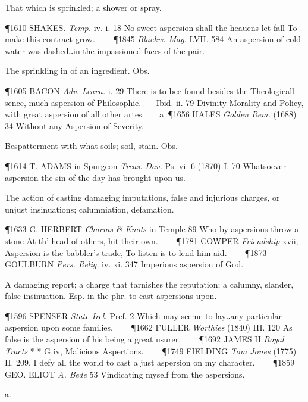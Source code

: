 \begin{description}[wide, labelwidth=!, labelindent=0pt]
\begin{myenumerate}
 That which is sprinkled; a shower or spray.

\P 1610 SHAKES.  \textit{Temp.} iv. i. 18 No sweet aspersion shall the heauens let fall To make this contract grow.    
\P 1845 \textit{Blackw. Mag.} LVII. 584 An aspersion of cold water was dashed‥in the impassioned faces of the pair.

 The sprinkling in of an ingredient. Obs.

\P 1605 BACON  \textit{Adv. Learn.} i. 29 There is to bee found besides the Theologicall sence, much aspersion of Philosophie.    Ibid. ii. 79 Divinity Morality and Policy, with great aspersion of all other artes.    a 
\P 1656 HALES  \textit{Golden Rem.} (1688) 34 Without any Aspersion of Severity.

 Bespatterment with what soils; soil, stain. Obs.

\P 1614 T. ADAMS in Spurgeon \textit{Treas. Dav.} Ps. vi. 6 (1870) I. 70 Whatsoever aspersion the sin of the day has brought upon us.

 The action of casting damaging imputations, false and injurious charges, or unjust insinuations; calumniation, defamation.

\P 1633 G. HERBERT  \textit{Charms \& Knots} in Temple 89 Who by aspersions throw a stone At th' head of others, hit their own.    
\P 1781 COWPER  \textit{Friendship} xvii, Aspersion is the babbler's trade, To listen is to lend him aid.    
\P 1873 GOULBURN  \textit{Pers. Relig.} iv. xi. 347 Imperious aspersion of God.

 A damaging report; a charge that tarnishes the reputation; a calumny, slander, false insinuation. Esp. in the phr. to cast aspersions upon.

\P 1596 SPENSER  \textit{State Irel.} Pref. 2 Which may seeme to lay‥any particular aspersion upon some families.    
\P 1662 FULLER  \textit{Worthies} (1840) III. 120 As false is the aspersion of his being a great usurer.    
\P 1692 JAMES II \textit{Royal Tracts} * * G iv, Malicious Aspertions.    
\P 1749 FIELDING  \textit{Tom Jones} (1775) II. 209, I defy all the world to cast a just aspersion on my character.    
\P 1859 GEO. ELIOT  \textit{A. Bede} 53 Vindicating myself from the aspersions.
\end{myenumerate}


 a.

\noindent {}

\vspace{-0.3cm}


\end{description}
